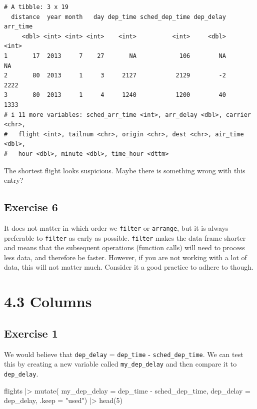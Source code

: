 \documentclass[
  letterpaper,
  DIV=11,
  numbers=noendperiod]{scrreprt}
\newenvironment{Shaded}{\begin{snugshade}}{\end{snugshade}}
\newcommand{\AttributeTok}[1]{\textcolor[rgb]{0.40,0.45,0.13}{#1}}
\newcommand{\DecValTok}[1]{\textcolor[rgb]{0.68,0.00,0.00}{#1}}
\newcommand{\FunctionTok}[1]{\textcolor[rgb]{0.28,0.35,0.67}{#1}}
\newcommand{\NormalTok}[1]{\textcolor[rgb]{0.00,0.23,0.31}{#1}}
\newcommand{\SpecialCharTok}[1]{\textcolor[rgb]{0.37,0.37,0.37}{#1}}
\newcommand{\StringTok}[1]{\textcolor[rgb]{0.13,0.47,0.30}{#1}}
\begin{document}
\begin{verbatim}
# A tibble: 3 x 19
  distance  year month   day dep_time sched_dep_time dep_delay arr_time
     <dbl> <int> <int> <int>    <int>          <int>     <dbl>    <int>
1       17  2013     7    27       NA            106        NA       NA
2       80  2013     1     3     2127           2129        -2     2222
3       80  2013     1     4     1240           1200        40     1333
# i 11 more variables: sched_arr_time <int>, arr_delay <dbl>, carrier <chr>,
#   flight <int>, tailnum <chr>, origin <chr>, dest <chr>, air_time <dbl>,
#   hour <dbl>, minute <dbl>, time_hour <dttm>
\end{verbatim}

The shortest flight looks suspicious. Maybe there is something wrong
with this entry?

\subsection{Exercise 6}\label{exercise-6-2}

It does not matter in which order we \texttt{filter} or
\texttt{arrange}, but it is always preferable to \texttt{filter} as
early as possible. \texttt{filter} makes the data frame shorter and
means that the subsequent operations (function calls) will need to
process less data, and therefore be faster. However, if you are not
working with a lot of data, this will not matter much. Consider it a
good practice to adhere to though.

\section{4.3 Columns}\label{columns}

\subsection{Exercise 1}\label{exercise-1-11}

We would believe that \texttt{dep\_delay} = \texttt{dep\_time} -
\texttt{sched\_dep\_time}. We can test this by creating a new variable
called \texttt{my\_dep\_delay} and then compare it to
\texttt{dep\_delay}.

\begin{Shaded}
\begin{Highlighting}[]
\NormalTok{flights }\SpecialCharTok{|\textgreater{}}
  \FunctionTok{mutate}\NormalTok{(}
    \AttributeTok{my\_dep\_delay =}\NormalTok{ dep\_time }\SpecialCharTok{{-}}\NormalTok{ sched\_dep\_time,}
    \AttributeTok{dep\_delay =}\NormalTok{ dep\_delay,}
    \AttributeTok{.keep =} \StringTok{"used"}\NormalTok{) }\SpecialCharTok{|\textgreater{}}
  \FunctionTok{head}\NormalTok{(}\DecValTok{5}\NormalTok{)}
\end{Highlighting}
\end{Shaded}
\end{document}
